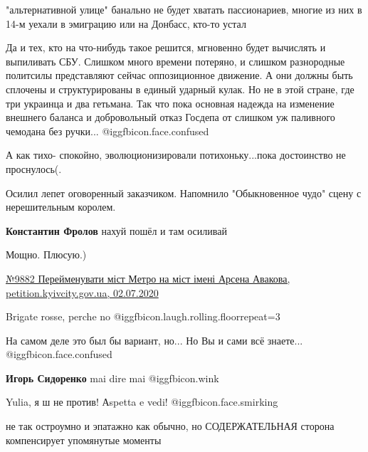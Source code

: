 \begin{itemize}

"альтернативной улице" банально не будет хватать пассионариев, многие из них в
14-м уехали в эмиграцию или на Донбасс, кто-то устал

\begin{itemize} %

Да и тех, кто на что-нибудь такое решится, мгновенно будет вычислять и
выпиливать СБУ. Слишком много времени потеряно, и слишком разнородные политсилы
представляют сейчас оппозиционное движение. А они должны быть сплочены и
структурированы в единый ударный кулак. Но не в этой стране, где три украинца и
два гетьмана. Так что пока основная надежда на изменение внешнего баланса и
добровольный отказ Госдепа от слишком уж паливного чемодана без ручки... @igg{fbicon.face.confused} 

\end{itemize} %

А как тихо- спокойно, эволюционизировали потихоньку...пока достоинство не проснулось(.

Осилил лепет оговоренный заказчиком. Напомнило "Обыкновенное чудо" сцену с нерешительным королем.

\begin{itemize} %
\textbf{Константин Фролов} нахуй пошёл и там осиливай
\end{itemize} %

Мощно. Плюсую.)

\href{https://petition.kyivcity.gov.ua/petition/?pid=9882}{%
№9882 Перейменувати міст Метро на міст імені Арсена Авакова, petition.kyivcity.gov.ua, 02.07.2020%
}

Brigate rosse, perche no @igg{fbicon.laugh.rolling.floor}{repeat=3} 

\begin{itemize} %
На самом деле это был бы вариант, но... Но Вы и сами всё знаете... @igg{fbicon.face.confused} 

\textbf{Игорь Сидоренко} mai dire mai @igg{fbicon.wink} 

Yulia, я ш не против! Аspetta e vedi! @igg{fbicon.face.smirking} 
\end{itemize} %

не так остроумно и эпатажно как обычно, но СОДЕРЖАТЕЛЬНАЯ сторона компенсирует упомянутые моменты


\end{itemize}
